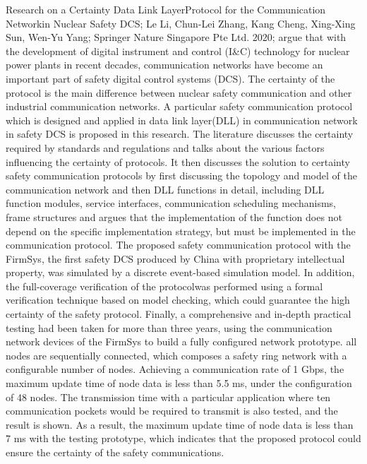 \documentclass[12pt]{article}
\begin{document}
Research on a Certainty Data Link LayerProtocol for the Communication Networkin Nuclear Safety DCS; Le Li, Chun-Lei Zhang, Kang Cheng, Xing-Xing Sun, Wen-Yu Yang; Springer Nature Singapore Pte Ltd. 2020; argue that with the development of digital instrument and control (I&C) technology for nuclear power plants in recent decades, communication networks have become an important part of safety digital control systems (DCS). The certainty of the protocol is the main difference between nuclear safety communication and other industrial communication networks. A particular safety communication protocol which is designed and applied in data link layer(DLL) in communication network in safety DCS is proposed in this research. The literature discusses the certainty required by standards and regulations and talks about the various factors influencing the certainty of protocols. It then discusses the solution to certainty safety communication protocols by first discussing the topology and model of the communication network and then DLL functions in detail, including DLL function modules, service interfaces, communication scheduling mechanisms, frame structures and argues that the implementation of the function does not depend on the specific implementation strategy, but must be implemented in the communication protocol. The proposed safety communication protocol with the FirmSys, the first safety DCS produced by China with proprietary intellectual property, was simulated by a discrete event-based simulation model. In addition, the full-coverage verification of the protocolwas performed using a formal verification technique based on model checking, which could guarantee the high certainty of the safety protocol. Finally, a comprehensive and in-depth practical testing had been taken for more than three years, using the communication network devices of the FirmSys to build a fully configured network prototype. all nodes are sequentially connected, which composes a safety ring network with a configurable number of nodes. Achieving a communication rate of 1 Gbps, the maximum update time of node data is less than 5.5 ms, under the configuration of 48 nodes. The transmission time with a particular application where ten communication pockets would be required to transmit is also tested, and the result is shown. As a result, the maximum update time of node data is less than 7 ms with the testing prototype, which indicates that the proposed protocol could ensure the certainty of the safety communications.
\end{document}
